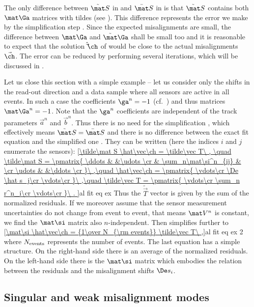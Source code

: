 The only difference between $\tilde\mat S$ in  and $\bar\mat S$ in  is that $\tilde\mat S$ contains both $\mat\Ga$ matrices with tildes (see ). This difference represents the error we make by the simplification step . Since the expected misalignments are small, the difference between $\mat\Ga$ and $\tilde\mat\Ga$ shall be small too and it is reasonable to expect that the solution $\hat\vec\ch$ of  would be close to the actual misalignments $\vec\ch$. The error can be reduced by performing several iterations, which will be discussed in .

Let us close this section with a simple example -- let us consider only the shifts in the read-out direction and a data sample where all sensors are active in all events. In such a case the coefficients $\ga^n = -1$ (cf.~) and thus matrices $\mat\Ga^n = -1$. Note that the $\ga^n$ coefficients are independent of the track parameters $\vec a^n$ and $\vec b^n$. Thus there is no need for the simplification , which effectively means $\tilde\mat S = \bar\mat S$ and there is no difference between the exact fit equation  and the simplified one . They can be written (here the indices $i$ and $j$ enumerate the sensors):
\eqref{\tilde\mat S \hat\vec\ch = \tilde\vec T\ , \quad
	\tilde\mat S = \pmatrix{
		\ddots	&						&\udots	\cr
				& \sum_n\mat\si^n_{ij}	&		\cr
		\udots	&						&\ddots	\cr
	}\ ,\quad
	\hat\vec\ch = \pmatrix{
		\vdots\cr
		\De \hat s_j\cr
		\vdots\cr
	}\ ,\quad
	\tilde\vec T = \pmatrix{
		\vdots\cr
		\sum_n r^n_i\cr
		\vdots\cr
	}\ .
}{al fit eq ex}
Thus the $\tilde\vec T$ vector is given by the sum of the normalized residuals. If we moreover assume that the sensor measurement uncertainties do not change from event to event, that means $\mat V^n$ is constant, we find the $\mat\si$ matrix also $n$-independent. Then  simplifies further to
\eqref{\mat\si \hat\vec\ch = {1\over N_{\rm events}} \tilde\vec T\ ,}{al fit eq ex 2}
where $N_{\rm events}$ represents the number of events. The last equation has a simple structure. On the right-hand side there is an average of the normalized residuals. On the left-hand side there is the $\mat\si$ matrix which embodies the relation between the residuals and the misalignment shifts $\De s_i$.


\subsection[al sing modes]{Singular and weak misalignment modes}


